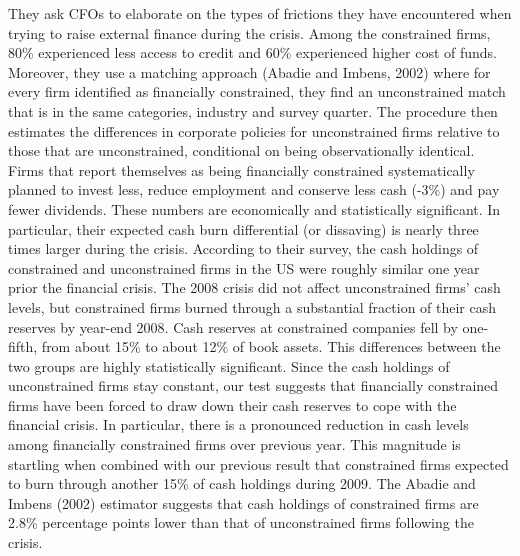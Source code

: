 \documentclass{article}
\begin{document}
{They ask CFOs to elaborate on the types of frictions they have encountered when trying to raise external finance during the crisis. Among the constrained firms, 80\% experienced less access to credit and 60\% experienced higher cost of funds. Moreover, they use a matching approach (Abadie and Imbens, 2002) where for every firm identified as financially constrained, they find an unconstrained match that is in the same categories, industry and survey quarter. The procedure then estimates the differences in corporate policies for unconstrained firms relative to those that are unconstrained, conditional on being observationally identical. Firms that report themselves as being financially constrained systematically planned to invest less, reduce employment and conserve less cash (-3\%) and pay fewer dividends. These numbers are economically and statistically significant. In particular, their expected cash burn differential (or dissaving) is nearly three times larger during the crisis. According to their survey, the cash holdings of constrained and unconstrained firms in the US were roughly similar one year prior the financial crisis. The 2008 crisis did not affect unconstrained firms' cash levels, but constrained firms burned through a substantial fraction of their cash reserves by year-end 2008. Cash reserves at constrained companies fell by one-fifth, from about 15\% to about 12\% of book assets. This differences between the two groups are highly statistically significant. Since the cash holdings of unconstrained firms stay constant, our test suggests that financially constrained firms have been forced to draw down their cash reserves to cope with the financial crisis. In particular, there is a pronounced reduction in cash levels among financially constrained firms over previous year. This magnitude is startling when combined with our previous result that constrained firms expected to burn through another 15\% of cash holdings during 2009. The Abadie and Imbens (2002) estimator suggests that cash holdings of constrained firms are 2.8\% percentage points lower than that of unconstrained firms following the crisis.  

}
\end{document}
